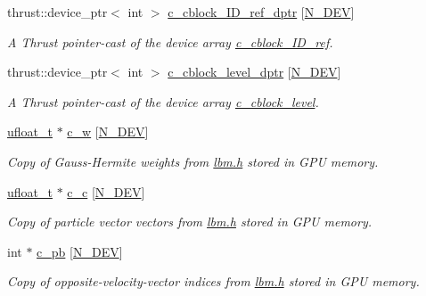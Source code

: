 \begin{DoxyCompactItemize}
thrust\+::device\+\_\+ptr$<$ int $>$ \hyperlink{classMesh_ae280e8ee23b619ebd3dae41230ecdbe9}{c\+\_\+cblock\+\_\+\+I\+D\+\_\+ref\+\_\+dptr} \mbox{[}\hyperlink{cppspec_8h_a2b674dab7a14f1bf32b48b7fda5022dc}{N\+\_\+\+D\+EV}\mbox{]}
\begin{DoxyCompactList}\small\item\em A Thrust pointer-\/cast of the device array \hyperlink{classMesh_a061a8950733957c307b6b352c19120b2}{c\+\_\+cblock\+\_\+\+I\+D\+\_\+ref}. \end{DoxyCompactList}\item 
thrust\+::device\+\_\+ptr$<$ int $>$ \hyperlink{classMesh_a72ac952958af3830c87578c10cb62e7e}{c\+\_\+cblock\+\_\+level\+\_\+dptr} \mbox{[}\hyperlink{cppspec_8h_a2b674dab7a14f1bf32b48b7fda5022dc}{N\+\_\+\+D\+EV}\mbox{]}
\begin{DoxyCompactList}\small\item\em A Thrust pointer-\/cast of the device array \hyperlink{classMesh_a883a91c4cf0446f344115ccbb3bc2f65}{c\+\_\+cblock\+\_\+level}. \end{DoxyCompactList}\item 
\hyperlink{cppspec_8h_af529d360dfac9b9578aa719418a53a21}{ufloat\+\_\+t} $\ast$ \hyperlink{classMesh_addc2191bde89ef706353fdea9328fd1f}{c\+\_\+w} \mbox{[}\hyperlink{cppspec_8h_a2b674dab7a14f1bf32b48b7fda5022dc}{N\+\_\+\+D\+EV}\mbox{]}
\begin{DoxyCompactList}\small\item\em Copy of Gauss-\/\+Hermite weights from \hyperlink{lbm_8h}{lbm.\+h} stored in G\+PU memory. \end{DoxyCompactList}\item 
\hyperlink{cppspec_8h_af529d360dfac9b9578aa719418a53a21}{ufloat\+\_\+t} $\ast$ \hyperlink{classMesh_a95f6a72b67aa96383233c21e269468de}{c\+\_\+c} \mbox{[}\hyperlink{cppspec_8h_a2b674dab7a14f1bf32b48b7fda5022dc}{N\+\_\+\+D\+EV}\mbox{]}
\begin{DoxyCompactList}\small\item\em Copy of particle vector vectors from \hyperlink{lbm_8h}{lbm.\+h} stored in G\+PU memory. \end{DoxyCompactList}\item 
int $\ast$ \hyperlink{classMesh_a81daee125bc85f7d5034930169683f2c}{c\+\_\+pb} \mbox{[}\hyperlink{cppspec_8h_a2b674dab7a14f1bf32b48b7fda5022dc}{N\+\_\+\+D\+EV}\mbox{]}
\begin{DoxyCompactList}\small\item\em Copy of opposite-\/velocity-\/vector indices from \hyperlink{lbm_8h}{lbm.\+h} stored in G\+PU memory. \end{DoxyCompactList}\item 

\end{DoxyCompactItemize}
